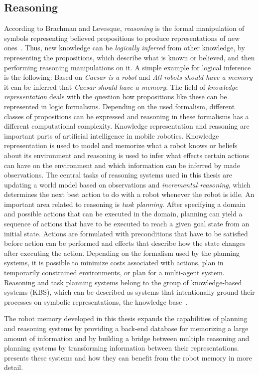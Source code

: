 \subsection{Reasoning}
\label{sec:reasoning}
According to Brachman and Levesque, \emph{reasoning} is the formal
manipulation of symbols representing believed propositions to produce
representations of new ones~\cite{kr-book}. Thus, new knowledge can be
\emph{logically inferred} from other knowledge, by representing the
propositions, which describe what is known or believed, and then
performing reasoning manipulations on it.  A simple example for
logical inference is the following: Based on \emph{Caesar is a robot}
and \emph{All robots should have a memory} it can be inferred that
\emph{Caesar should have a memory}.  The field of \emph{knowledge
  representation} deals with the question how propositions like these
can be represented in logic formalisms.  Depending on the used
formalism, different classes of propositions can be expressed and
reasoning in these formalisms has a different computational
complexity. Knowledge representation and reasoning are important parts
of artificial intelligence in mobile robotics. Knowledge
representation is used to model and memorize what a robot knows or
beliefs about its environment and reasoning is used to infer what
effects certain actions can have on the environment and which
information can be inferred by made observations. The central tasks of
reasoning systems used in this thesis are updating a world model based
on observations and \emph{incremental reasoning}, which determines the
next best action to do with a robot whenever the robot is idle. An
important area related to reasoning is \emph{task planning}. After
specifying a domain and possible actions that can be executed in the
domain, planning can yield a sequence of actions that have to be
executed to reach a given goal state from an initial state. Actions
are formulated with preconditions that have to be satisfied before
action can be performed and effects that describe how the state
changes after executing the action. Depending on the formalism used by
the planning systems, it is possible to minimize costs associated with
actions, plan in temporarily constrained environments, or plan for a
multi-agent system. Reasoning and task planning systems belong to the
group of knowledge-based systems (KBS), which can be described as
systems that intentionally ground their processes on symbolic
representations, the knowledge base~\cite{kr-book}.

The robot memory developed in this thesis expands the capabilities of
planning and reasoning systems by providing a back-end database for
memorizing a large amount of information and by building a bridge
between multiple reasoning and planning systems by transforming
information between their representations. 
presents these systems and how they can benefit from the robot memory
in more detail.
  

